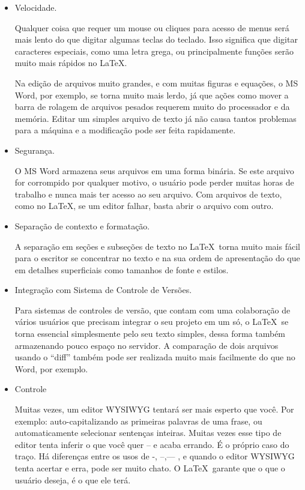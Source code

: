 \documentclass[10pt]{article}
\begin{document}
\begin{itemize}
\item Velocidade.

Qualquer coisa que requer um mouse ou cliques para acesso de menus será mais lento do que digitar algumas teclas do teclado. Isso significa que digitar caracteres especiais, como uma letra grega, ou principalmente funções serão muito mais rápidos no \LaTeX.

Na edição de arquivos muito grandes, e com muitas figuras e equações, o MS Word, por exemplo, se torna muito mais lerdo, já que ações como mover a barra de rolagem de arquivos pesados requerem muito do processador e da memória. Editar um simples arquivo de texto já não causa tantos problemas para a máquina e a modificação pode ser feita rapidamente.

\item Segurança.

O MS Word armazena seus arquivos em uma forma binária. Se este arquivo for corrompido por qualquer motivo, o usuário pode perder muitas horas de trabalho e nunca mais ter acesso ao seu arquivo. Com arquivos de texto, como no \LaTeX, se um editor falhar, basta abrir o arquivo com outro.

\item Separação de contexto e formatação.

A separação em seções e subseções de texto no \LaTeX\ torna muito mais fácil para o escritor se concentrar no texto e na sua ordem de apresentação do que em detalhes superficiais como tamanhos de fonte e estilos.

\item Integração com Sistema de Controle de Versões.

Para sistemas de controles de versão, que contam com uma colaboração de vários usuários que precisam integrar o seu projeto em um só, o \LaTeX\ se torna essencial simplesmente pelo seu texto simples, dessa forma também armazenando pouco espaço no servidor. A comparação de dois arquivos usando o ``diff'' também pode ser realizada muito mais facilmente do que no Word, por exemplo.

\item Controle

Muitas vezes, um editor WYSIWYG tentará ser mais esperto que você. Por exemplo: auto-capitalizando as primeiras palavras de uma frase, ou automaticamente selecionar sentenças inteiras. Muitas vezes esse tipo de editor tenta inferir o que você quer -- e acaba errando. É o próprio caso do traço. Há diferenças entre os usos de -, --,--- , e quando o editor WYSIWYG tenta acertar e erra, pode ser muito chato. O \LaTeX\ garante que o que o usuário deseja, é o que ele terá.


\end{itemize}
\end{document}
